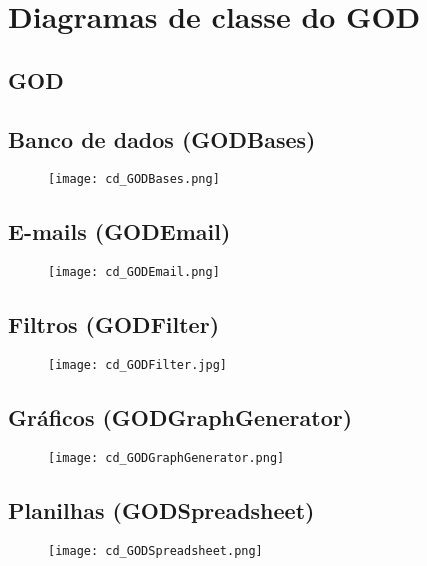 \section{Diagramas de classe do GOD}


\subsection{GOD}


\subsection{Banco de dados (GODBases)}

\begin{figure}[H]
\centering
\texttt{[image: cd\_GODBases.png]}
\label{fig:cd-godbases}
\end{figure}

\subsection{E-mails (GODEmail)}
\begin{figure}[H]
\centering
\texttt{[image: cd\_GODEmail.png]}
\label{fig:cd-godemail}
\end{figure}

\subsection{Filtros (GODFilter)}
\begin{figure}[H]
\centering
\texttt{[image: cd\_GODFilter.jpg]}
\label{fig:cd-godfilter}
\end{figure}

\subsection{Gráficos (GODGraphGenerator)}
\begin{figure}[H]
\centering
\texttt{[image: cd\_GODGraphGenerator.png]}
\label{fig:cd-godgraphgenerator}
\end{figure}

\subsection{Planilhas (GODSpreadsheet)}
\begin{figure}[H]
\centering
\texttt{[image: cd\_GODSpreadsheet.png]}
\label{fig:cd-godspreadsheet}
\end{figure}

